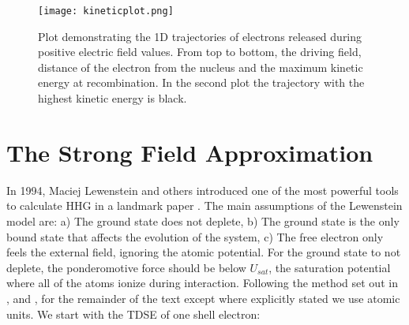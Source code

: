 \documentclass[11pt,a4paper]{report}
\begin{document}
\begin{figure}[h]
\centering
\texttt{[image: kineticplot.png]}
\caption{Plot demonstrating the 1D trajectories of electrons released during positive electric field values. From top to bottom, the driving field, distance of the electron from the nucleus and the maximum kinetic energy at recombination. In the second plot the trajectory with the highest kinetic energy is black.}
\end{figure}
\newpage


\section{The Strong Field Approximation}
In 1994, Maciej Lewenstein and others introduced one of the most powerful tools to calculate HHG in a landmark paper \cite{lewensteinog}. The main assumptions of the Lewenstein model are: a) The ground state does not deplete, b) The ground state is the only bound state that affects the evolution of the system, c) The free electron only feels the external field, ignoring the atomic potential. For the ground state to not deplete, the ponderomotive force should be below $U_{sat}$, the saturation potential where all of the atoms ionize during interaction. Following the method set out in \cite{smirnovaMultielectronHighHarmonic2013}, \cite{propagators} and \cite{Emiliomasters}, for the remainder of the text except where explicitly stated we use atomic units. We start with the TDSE of one shell electron:
\end{document}
